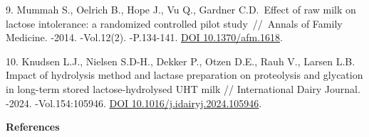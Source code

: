 \begin{refs}
9. Mummah S., Oelrich B., Hope J., Vu Q., Gardner C.D.~Effect of raw
milk on lactose intolerance: a randomized controlled pilot
study~//~Annals of Family Medicine. -2014. -Vol.12(2). -P.134-141.
\href{https://doi.org/10.1370/afm.1618}{DOI 10.1370/afm.1618}.

10. Knudsen L.J., Nielsen S.D-H., Dekker P., Otzen D.E., Rauh V., Larsen
L.B. Impact of hydrolysis method and lactase preparation on proteolysis
and glycation in long-term stored lactose-hydrolysed UHT milk //
International Dairy Journal. -2024. -Vol.154:105946.
\href{https://doi.org/10.1016/j.idairyj.2024.105946}{DOI
10.1016/j.idairyj.2024.105946}.
\end{refs}

\begin{center}
{\bfseries References}
\end{center}

